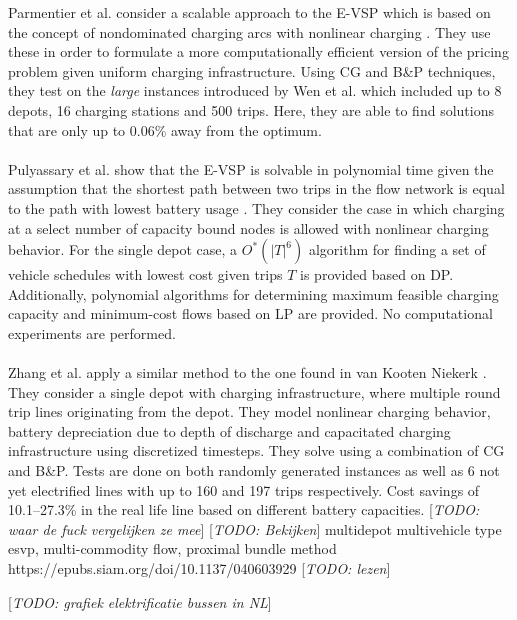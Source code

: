 \documentclass[ht]{article}
\newcommand{\todo}[1]{{\color{red}[\textit{TODO: #1}]}}
\begin{document}
Parmentier et al. consider a scalable approach to the E-VSP which is based on
the concept of nondominated charging arcs with nonlinear charging
\cite{Parmentier2023}. They use these in order to formulate a more
computationally efficient version of the pricing problem given uniform charging
infrastructure. Using CG and B\&P techniques, they test on the \textit{large}
instances introduced by Wen et al. \cite{Wen2016} which included up to 8
depots, 16 charging stations and 500 trips. Here, they are able to find
solutions that are only up to 0.06\% away from the optimum. \\\\

Pulyassary et al. show that the E-VSP is solvable in polynomial time given the
assumption that the shortest path between two trips in the flow network is
equal to the path with lowest battery usage \cite{Pulyassary2024}. They
consider the case in which charging at a select number of capacity bound nodes
is allowed with nonlinear charging behavior. For the single depot case, a
$O^*(|T|^6)$ algorithm for finding a set of vehicle schedules with lowest cost
given trips $T$ is provided based on DP. Additionally, polynomial algorithms
for determining maximum feasible charging capacity and minimum-cost flows based
on LP are provided. No computational experiments are performed. \\\\

Zhang et al. apply a similar method to the one found in van Kooten Niekerk
\cite{Zhang2021}. They consider a single depot with charging infrastructure,
where multiple round trip lines originating from the depot. They model
nonlinear charging behavior, battery depreciation due to depth of discharge and
capacitated charging infrastructure using discretized timesteps. They solve
using a combination of CG and B\&P. Tests are done on both randomly generated
instances as well as 6 not yet electrified lines with up to 160 and 197 trips
respectively. Cost savings of 10.1–27.3\% in the real life line based on
different battery capacities. \todo{waar de fuck vergelijken ze mee}
\todo{Bekijken} multidepot multivehicle type esvp, multi-commodity flow,
proximal bundle method https://epubs.siam.org/doi/10.1137/040603929
\todo{lezen}\cite{Borndörfer2024}

\todo{grafiek elektrificatie bussen in NL}
\end{document}

